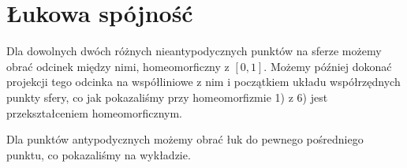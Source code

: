 \section*{Łukowa spójność}
Dla dowolnych dwóch różnych nieantypodycznych punktów na sferze możemy obrać odcinek między nimi, homeomorficzny z $[0,1]$. Możemy później dokonać projekcji tego odcinka na współliniowe z nim i początkiem układu współrzędnych punkty sfery, co jak pokazaliśmy przy homeomorfizmie 1) z 6) jest przekształceniem homeomorficznym.

Dla punktów antypodycznych możemy obrać łuk do pewnego pośredniego punktu, co pokazaliśmy na wykładzie.
